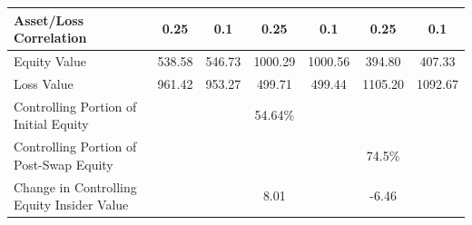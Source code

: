 \begin{table}
\begin{center}
\begin{tabular}{p{2in}cccccc}
Asset/Loss Correlation &       0.25 &        0.1 &       0.25 &        0.1 &       0.25 &        0.1 \\ 

\midrule 

Equity Value & 538.58 &   546.73 &   1000.29 &   1000.56 &    394.80 &     407.33 \\ 

Loss Value & 961.42 &   953.27 &   499.71 &   499.44 &   1105.20 &    1092.67 \\ 

\midrule

Controlling Portion of Initial Equity &            &            &   54.64\% &            &            &            \\ 

Controlling Portion of Post-Swap Equity &            &            &            &            &   74.5\% &            \\ 

\midrule

Change in Controlling Equity Insider Value &            &            &   8.01 &            &   -6.46 &            \\ 

\bottomrule

\end{tabular}  
\end{center}
\end{table}


